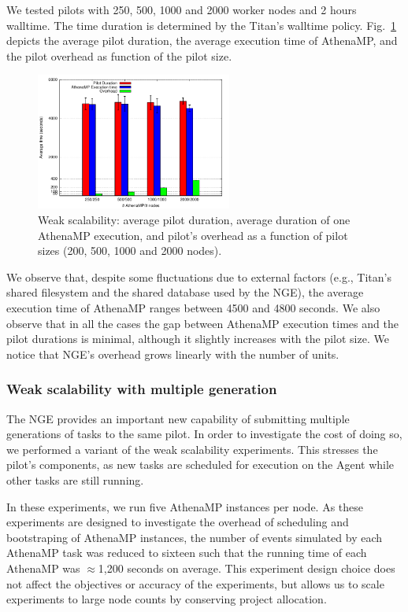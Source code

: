 We tested pilots with 250, 500, 1000 and 2000 worker nodes and 2 hours
walltime. The time duration is determined by the Titan's walltime policy.
Fig.~\ref{fig:weakScal1a} depicts the average pilot duration, the average
execution time of AthenaMP, and the pilot overhead as function of the pilot
size.

\begin{figure}[!t]
    \includegraphics[height=4.5cm,width=\columnwidth]{./figures/NGE/weak1.pdf}
   	\vspace{-0.3in}
    \caption{Weak scalability: average pilot duration, average duration of
    one AthenaMP execution, and pilot's overhead as a function of pilot sizes
    (200, 500, 1000 and 2000 nodes).}\label{fig:weakScal1a}
\end{figure}

We observe that, despite some fluctuations due to external factors (e.g.,
Titan's shared filesystem and the shared database used by the NGE), the
average execution time of AthenaMP ranges between 4500 and 4800 seconds. We
also observe that in all the cases the gap between AthenaMP execution times
and the pilot durations is minimal, although it slightly increases with the
pilot size. We notice that NGE's overhead grows linearly with the number
of units.

\subsubsection{Weak scalability with multiple generation}

The NGE provides an important new capability of submitting multiple
generations of tasks to the same pilot. In order to investigate the cost
of doing so, we performed a variant of the weak scalability experiments. This
stresses the pilot's components, as new tasks are scheduled for execution on
the Agent while other tasks are still running.

In these experiments, we run five AthenaMP instances per node. As these
experiments are designed to investigate the overhead of  scheduling and
bootstraping of AthenaMP instances, the number of events simulated by each
AthenaMP task was reduced to sixteen such that the running time of each
AthenaMP was \(\approx\)1,200 seconds on average. This experiment design choice
does not affect the objectives or accuracy of the experiments, but allows us
to scale experiments to large node counts by conserving project allocation.

